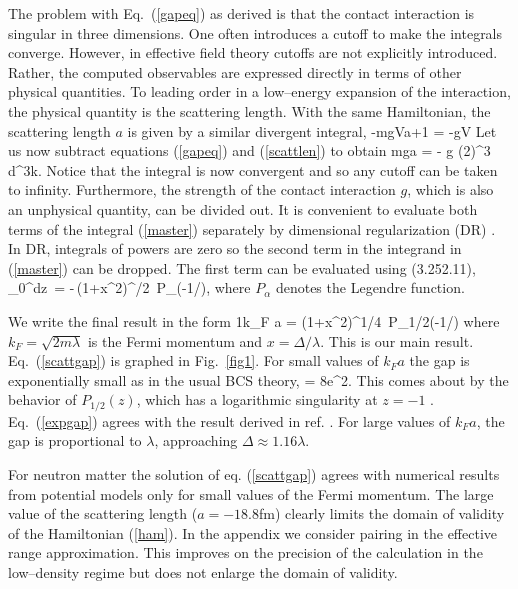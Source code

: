 The problem with Eq.~(\ref{gapeq}) as derived is that the contact interaction 
is singular in three dimensions.  One often introduces a cutoff to 
make the integrals converge. However, in effective field theory cutoffs 
are not explicitly introduced.  Rather, the computed observables are 
expressed directly in
terms of other physical quantities.  To leading order in a low--energy
expansion of the interaction, the physical quantity is the scattering
length.  With the same Hamiltonian, the scattering 
length $a$ is given by a similar divergent integral,
\be
\label{scattlen}
-{mgV\pi a}+1 = -{gV } 
\ee
Let us now subtract equations (\ref{gapeq}) and (\ref{scattlen}) to obtain
\be
\label{master}
{mg\pi a} = - {g (2\pi)^3} \int d^3k.
\ee
Notice that the integral is now convergent and so any cutoff can be taken
to infinity. Furthermore, the strength of the contact interaction $g$, 
which is also an unphysical quantity, can be divided out.    
It is convenient to evaluate both terms of the integral (\ref{master}) 
separately by dimensional regularization (DR) \cite{Collins}. In
DR, integrals of powers are zero so the second term in the integrand in
(\ref{master}) can be dropped. The first term can be evaluated using 
\cite{Gradshteyn} (3.252.11),
\be
\label{integral}
\int\limits_0^\infty dz\,
 = -{\pi\over \sin\pi\alpha}\,(1+x^2)^{\alpha/2}\,
P_\alpha\left(-1/\right),
\ee
where $P_\alpha$ denotes the Legendre function.

We write the final result in the form
\be
\label{scattgap}
{1\over k_F a} = (1+x^2)^{1/4} \,P_{1/2}\left(-1/\right)
\ee
where $k_F = \sqrt{2 m\lambda}$ is the Fermi momentum and
$x=\Delta/\lambda$.  This is our main result.  Eq.~(\ref{scattgap}) is 
graphed in Fig.~\ref{fig1}. For small values of $k_Fa$ the gap is 
exponentially small as in the usual
BCS theory,
\be
\label{expgap}
\Delta = {8\over e^2}\lambda{}.
\ee 
This comes about by the behavior of $P_{1/2}(z)$, 
which has a logarithmic singularity at $z=-1$ \cite{Bateman}. 
Eq.~(\ref{expgap}) agrees with the result derived in ref. \cite{Khodel96}.
For large values of $k_Fa$, the gap is proportional to $\lambda$, approaching
$\Delta\approx 1.16\lambda$. 

For neutron matter the solution of eq. (\ref{scattgap}) agrees
with numerical results from potential models only for small values 
of the Fermi momentum. The large value of the scattering length ($a=-18.8$fm)
clearly limits the domain of validity of the Hamiltonian (\ref{ham}). 
In the appendix we consider pairing in the effective range approximation.
This improves on the precision of the calculation in the low--density regime
but does not enlarge the domain of validity. 

